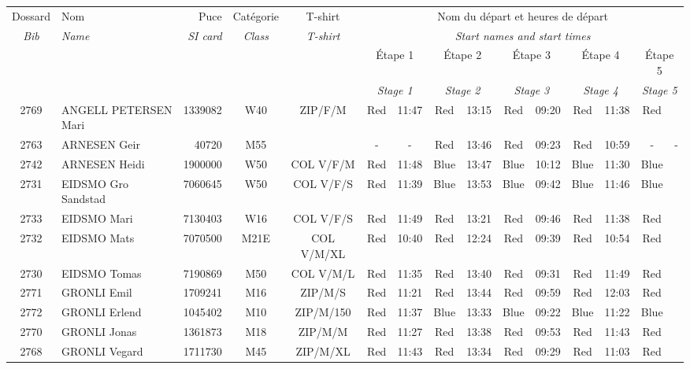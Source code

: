 \documentclass{report}
\begin{document}
  \begin{longtable}{|c|l|r|c|c|*{5}{cc|}}
    Dossard & Nom  & Puce    & Catégorie & T-shirt & \multicolumn{10}{c|}{Nom du départ et heures de départ} \\
    \itshape Bib     & \itshape Name & \itshape SI card & \itshape Class  & \itshape  T-shirt  & \multicolumn{10}{c|}{\itshape Start names and start times} \\
    \hline
    & & & & & \multicolumn{2}{c|}{Étape 1} & \multicolumn{2}{c|}{Étape 2} & \multicolumn{2}{c|}{Étape 3} & \multicolumn{2}{c|}{Étape 4} & \multicolumn{2}{c|}{Étape 5} \\
    & & & & & \multicolumn{2}{c|}{\itshape Stage 1} & \multicolumn{2}{c|}{\itshape Stage 2} & \multicolumn{2}{c|}{\itshape Stage 3} & \multicolumn{2}{c|}{\itshape Stage 4} & \multicolumn{2}{c|}{\itshape Stage 5} \\
    \hline
    2769 & ANGELL PETERSEN Mari & 1339082 & W40 & ZIP/F/M & Red & 11:47 & Red & 13:15 & Red & 09:20 & Red & 11:38 & Red &  \\
    2763 & ARNESEN Geir & 40720 & M55 &   & - &  - & Red & 13:46 & Red & 09:23 & Red & 10:59 & - &  -\\
    2742 & ARNESEN Heidi & 1900000 & W50 & COL V/F/M & Red & 11:48 & Blue & 13:47 & Blue & 10:12 & Blue & 11:30 & Blue &  \\
    2731 & EIDSMO Gro Sandstad & 7060645 & W50 & COL V/F/S & Red & 11:39 & Blue & 13:53 & Blue & 09:42 & Blue & 11:46 & Blue &  \\
    2733 & EIDSMO Mari & 7130403 & W16 & COL V/F/S & Red & 11:49 & Red & 13:21 & Red & 09:46 & Red & 11:38 & Red &  \\
    2732 & EIDSMO Mats & 7070500 & M21E & COL V/M/XL & Red & 10:40 & Red & 12:24 & Red & 09:39 & Red & 10:54 & Red &  \\
    2730 & EIDSMO Tomas & 7190869 & M50 & COL V/M/L & Red & 11:35 & Red & 13:40 & Red & 09:31 & Red & 11:49 & Red &  \\
    2771 & GRONLI Emil & 1709241 & M16 & ZIP/M/S & Red & 11:21 & Red & 13:44 & Red & 09:59 & Red & 12:03 & Red &  \\
    2772 & GRONLI Erlend & 1045402 & M10 & ZIP/M/150 & Red & 11:37 & Blue & 13:33 & Blue & 09:22 & Blue & 11:22 & Blue &  \\
    2770 & GRONLI Jonas & 1361873 & M18 & ZIP/M/M & Red & 11:27 & Red & 13:38 & Red & 09:53 & Red & 11:43 & Red &  \\
    2768 & GRONLI Vegard & 1711730 & M45 & ZIP/M/XL & Red & 11:43 & Red & 13:34 & Red & 09:29 & Red & 11:03 & Red &  \\

\end{longtable}
\end{document}
